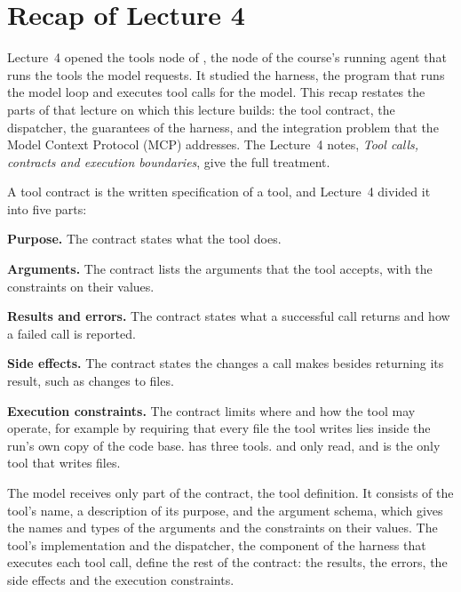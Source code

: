 \section*{Recap of Lecture 4}
\makeatletter
\def\@currentlabel{Recap of Lecture~4}\def\@currentlabelname{Recap of Lecture~4}%
\def\cref@currentlabel{[recap][1][]Recap of Lecture~4}%
\makeatother
{}
\label{sec:recap}

Lecture~4 opened the tools node of \msa{}, the node of the course's running agent that runs the
tools the model requests. It studied the harness, the program that runs the model loop and executes
tool calls for the model. This recap restates the parts of that lecture on which this lecture builds: the
tool contract, the dispatcher, the guarantees of the harness, and the integration problem that the
Model Context Protocol (MCP) addresses. The Lecture~4 notes, \emph{Tool calls, contracts and
execution boundaries}, give the full treatment.

A tool contract is the written specification of a tool, and Lecture~4 divided it into five parts:
\bi
\item \textbf{Purpose.} The contract states what the tool does.
\item \textbf{Arguments.} The contract lists the arguments that the tool accepts, with the
constraints on their values.
\item \textbf{Results and errors.} The contract states what a successful call returns and how a
failed call is reported.
\item \textbf{Side effects.} The contract states the changes a call makes besides returning its
result, such as changes to files.
\item \textbf{Execution constraints.} The contract limits where and how the tool may operate, for
example by requiring that every file the tool writes lies inside the run's own copy of the code
base.
\ei
\msa{} has three tools.  and  only read, and  is
the only tool that writes files.

The model receives only part of the contract, the tool definition. It consists of the tool's name,
a description of its purpose, and the argument schema, which gives the names and types of the
arguments and the constraints on their values. The tool's implementation and the dispatcher, the
component of the harness that executes each tool call, define the rest of the contract: the
results, the errors, the side effects and the execution constraints.

